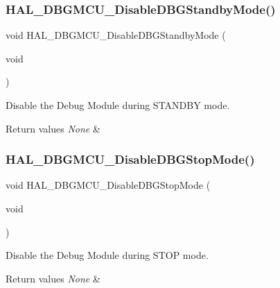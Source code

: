 \subsubsection{\texorpdfstring{HAL\_DBGMCU\_DisableDBGStandbyMode()}{HAL\_DBGMCU\_DisableDBGStandbyMode()}}
{\footnotesize\ttfamily void H\+A\+L\+\_\+\+D\+B\+G\+M\+C\+U\+\_\+\+Disable\+D\+B\+G\+Standby\+Mode (\begin{DoxyParamCaption}\item[{void}]{ }\end{DoxyParamCaption})}



Disable the Debug Module during S\+T\+A\+N\+D\+BY mode. 


\begin{DoxyRetVals}{Return values}
{\em None} & \\
\hline
\end{DoxyRetVals}
\mbox{\label{group___h_a_l___exported___functions___group2_ga2c93dcee35e5983d74f1000de7c042d5}} 
\subsubsection{\texorpdfstring{HAL\_DBGMCU\_DisableDBGStopMode()}{HAL\_DBGMCU\_DisableDBGStopMode()}}
{\footnotesize\ttfamily void H\+A\+L\+\_\+\+D\+B\+G\+M\+C\+U\+\_\+\+Disable\+D\+B\+G\+Stop\+Mode (\begin{DoxyParamCaption}\item[{void}]{ }\end{DoxyParamCaption})}



Disable the Debug Module during S\+T\+OP mode. 


\begin{DoxyRetVals}{Return values}
{\em None} & \\
\hline
\end{DoxyRetVals}
\mbox{\label{group___h_a_l___exported___functions___group2_gaf031bcc71ebad9b7edf405547efd762b}} 
